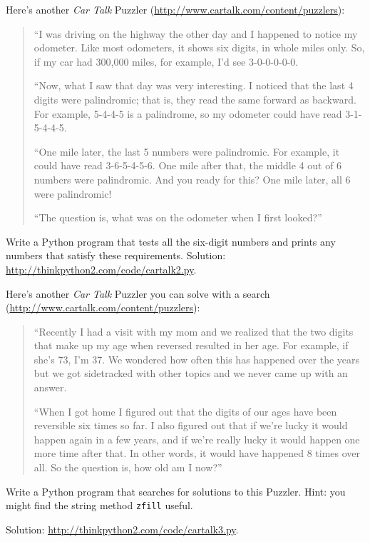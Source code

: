 \documentclass[10pt]{book}
\begin{document}
\begin{exercise}
Here's another {\em Car Talk}
Puzzler (\url{http://www.cartalk.com/content/puzzlers}):

\begin{quote}
``I was driving on the highway the other day and I happened to
notice my odometer. Like most odometers, it shows six digits,
in whole miles only. So, if my car had 300,000
miles, for example, I'd see 3-0-0-0-0-0.

``Now, what I saw that day was very interesting. I noticed that the
last 4 digits were palindromic; that is, they read the same forward as
backward. For example, 5-4-4-5 is a palindrome, so my odometer
could have read 3-1-5-4-4-5.

``One mile later, the last 5 numbers were palindromic. For example, it
could have read 3-6-5-4-5-6.  One mile after that, the middle 4 out of
6 numbers were palindromic.  And you ready for this? One mile later,
all 6 were palindromic!

``The question is, what was on the odometer when I first looked?''
\end{quote}

Write a Python program that tests all the six-digit numbers and prints
any numbers that satisfy these requirements.
Solution: \url{http://thinkpython2.com/code/cartalk2.py}.

\end{exercise}


\begin{exercise}
Here's another {\em Car Talk} Puzzler you can solve with a
search (\url{http://www.cartalk.com/content/puzzlers}):

\begin{quote}
``Recently I had a visit with my mom and we realized that
the two digits that make up my age when reversed resulted in her
age. For example, if she's 73, I'm 37. We wondered how often this has
happened over the years but we got sidetracked with other topics and
we never came up with an answer.

``When I got home I figured out that the digits of our ages have been
reversible six times so far. I also figured out that if we're lucky it
would happen again in a few years, and if we're really lucky it would
happen one more time after that. In other words, it would have
happened 8 times over all. So the question is, how old am I now?''

\end{quote}

Write a Python program that searches for solutions to this Puzzler.
Hint: you might find the string method {\tt zfill} useful.

Solution: \url{http://thinkpython2.com/code/cartalk3.py}.

\end{exercise}
\end{document}
